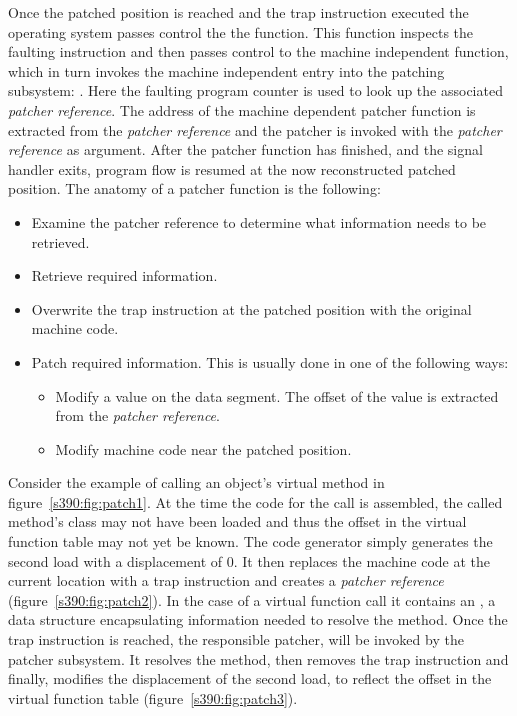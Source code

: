 Once the patched position is reached and the trap instruction executed the operating system passes control the the  function. This function inspects the faulting instruction and then passes control to the machine independent  function, which in turn invokes the machine independent entry into the patching subsystem: . Here the faulting program counter is used to look up the associated \emph{patcher reference}. The address of the machine dependent patcher function is extracted from the \emph{patcher reference} and the patcher is invoked with the \emph{patcher reference} as argument. After the patcher function has finished, and the signal handler exits, program flow is resumed at the now reconstructed patched position. The anatomy of a patcher function is the following:

\begin{itemize}
	\item Examine the patcher reference to determine what information needs to be retrieved.
	\item Retrieve required information.
	\item Overwrite the trap instruction at the patched position with the original machine code.
	\item Patch required information. This is usually done in one of the following ways:
	\begin{itemize}
		\item Modify a value on the data segment. The offset of the value is extracted from the \emph{patcher reference}.
		\item Modify machine code near the patched position.
	\end{itemize}
\end{itemize}

Consider the example of calling an object's virtual method in figure~\ref{s390:fig:patch1}. At the time the code for the call is assembled, the called method's class may not have been loaded and thus the offset in the virtual function table may not yet be known. The code generator simply generates the second load with a displacement of 0. It then replaces the machine code at the current location with a trap instruction and creates a \emph{patcher reference} (figure~\ref{s390:fig:patch2}). In the case of a virtual function call it contains an , a data structure encapsulating information needed to resolve the method. Once the trap instruction is reached, the responsible patcher,  will be invoked by the patcher subsystem. It resolves the method, then removes the trap instruction and finally, modifies the displacement of the second load, to reflect the offset in the virtual function table (figure~\ref{s390:fig:patch3}).

